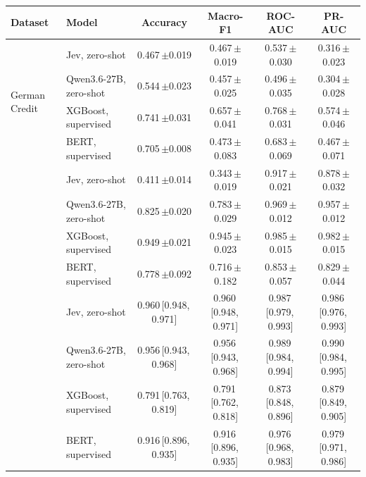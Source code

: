 \begin{tabular}{llcccc}
\toprule
Dataset & Model & Accuracy & Macro-F1 & ROC-AUC & PR-AUC \\
\midrule
\multirow{4}{*}{German Credit} & Jev, zero-shot & 0.467\,{\scriptsize$\pm$0.019} & 0.467\,{\scriptsize$\pm$0.019} & 0.537\,{\scriptsize$\pm$0.030} & 0.316\,{\scriptsize$\pm$0.023} \\
 & Qwen3.6-27B, zero-shot & 0.544\,{\scriptsize$\pm$0.023} & 0.457\,{\scriptsize$\pm$0.025} & 0.496\,{\scriptsize$\pm$0.035} & 0.304\,{\scriptsize$\pm$0.028} \\
 & XGBoost, supervised & 0.741\,{\scriptsize$\pm$0.031} & 0.657\,{\scriptsize$\pm$0.041} & 0.768\,{\scriptsize$\pm$0.031} & 0.574\,{\scriptsize$\pm$0.046} \\
 & BERT, supervised & 0.705\,{\scriptsize$\pm$0.008} & 0.473\,{\scriptsize$\pm$0.083} & 0.683\,{\scriptsize$\pm$0.069} & 0.467\,{\scriptsize$\pm$0.071} \\
\addlinespace
\multirow{4}{*}{Breast Cancer Wisconsin} & Jev, zero-shot & 0.411\,{\scriptsize$\pm$0.014} & 0.343\,{\scriptsize$\pm$0.019} & 0.917\,{\scriptsize$\pm$0.021} & 0.878\,{\scriptsize$\pm$0.032} \\
 & Qwen3.6-27B, zero-shot & 0.825\,{\scriptsize$\pm$0.020} & 0.783\,{\scriptsize$\pm$0.029} & 0.969\,{\scriptsize$\pm$0.012} & 0.957\,{\scriptsize$\pm$0.012} \\
 & XGBoost, supervised & 0.949\,{\scriptsize$\pm$0.021} & 0.945\,{\scriptsize$\pm$0.023} & 0.985\,{\scriptsize$\pm$0.015} & 0.982\,{\scriptsize$\pm$0.015} \\
 & BERT, supervised & 0.778\,{\scriptsize$\pm$0.092} & 0.716\,{\scriptsize$\pm$0.182} & 0.853\,{\scriptsize$\pm$0.057} & 0.829\,{\scriptsize$\pm$0.044} \\
\addlinespace
\multirow{4}{*}{SST-2} & Jev, zero-shot & 0.960\,{\scriptsize[0.948,\,0.971]} & 0.960\,{\scriptsize[0.948,\,0.971]} & 0.987\,{\scriptsize[0.979,\,0.993]} & 0.986\,{\scriptsize[0.976,\,0.993]} \\
 & Qwen3.6-27B, zero-shot & 0.956\,{\scriptsize[0.943,\,0.968]} & 0.956\,{\scriptsize[0.943,\,0.968]} & 0.989\,{\scriptsize[0.984,\,0.994]} & 0.990\,{\scriptsize[0.984,\,0.995]} \\
 & XGBoost, supervised & 0.791\,{\scriptsize[0.763,\,0.819]} & 0.791\,{\scriptsize[0.762,\,0.818]} & 0.873\,{\scriptsize[0.848,\,0.896]} & 0.879\,{\scriptsize[0.849,\,0.905]} \\
 & BERT, supervised & 0.916\,{\scriptsize[0.896,\,0.935]} & 0.916\,{\scriptsize[0.896,\,0.935]} & 0.976\,{\scriptsize[0.968,\,0.983]} & 0.979\,{\scriptsize[0.971,\,0.986]} \\

\end{tabular}
